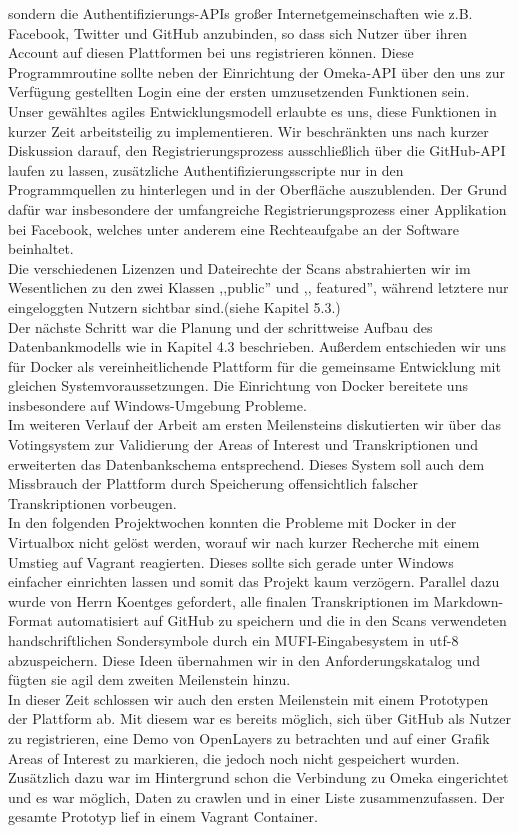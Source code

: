 \documentclass{article}
\begin{document}
sondern die Authentifizierungs-APIs großer Internetgemeinschaften wie z.B. Facebook, Twitter und GitHub anzubinden, so dass sich Nutzer über ihren Account auf diesen Plattformen bei uns registrieren können.
Diese Programmroutine sollte neben der Einrichtung der Omeka-API über den uns zur Verfügung gestellten Login eine der ersten umzusetzenden Funktionen sein.\\
Unser gewähltes agiles Entwicklungsmodell erlaubte es uns, diese Funktionen in kurzer Zeit arbeitsteilig zu implementieren.
Wir beschränkten uns nach kurzer Diskussion darauf, den Registrierungsprozess ausschließlich über die GitHub-API laufen zu lassen, zusätzliche Authentifizierungsscripte nur in den Programmquellen zu hinterlegen und in der Oberfläche auszublenden. 
Der Grund dafür war insbesondere der umfangreiche Registrierungsprozess einer Applikation bei Facebook, welches unter anderem eine Rechteaufgabe an der Software beinhaltet.\\
Die verschiedenen Lizenzen und Dateirechte der Scans abstrahierten wir im Wesentlichen zu den zwei Klassen ,,public'' und ,, featured'', während letztere nur eingeloggten Nutzern sichtbar sind.(siehe Kapitel 5.3.)\\
Der nächste Schritt war die Planung und der schrittweise Aufbau des Datenbankmodells wie in Kapitel 4.3 beschrieben. 
Außerdem entschieden wir uns für Docker als vereinheitlichende Plattform für die gemeinsame Entwicklung mit gleichen Systemvoraussetzungen.
Die Einrichtung von Docker bereitete uns insbesondere auf Windows-Umgebung Probleme.\\
Im weiteren Verlauf der Arbeit am ersten Meilensteins diskutierten wir über das Votingsystem zur Validierung der Areas of Interest und Transkriptionen und 
erweiterten das Datenbankschema entsprechend. 
Dieses System soll auch dem Missbrauch der Plattform durch Speicherung offensichtlich falscher Transkriptionen vorbeugen.\\
In den folgenden Projektwochen konnten die Probleme mit Docker in der Virtualbox nicht gelöst werden, worauf wir nach kurzer Recherche mit einem Umstieg auf Vagrant reagierten.
Dieses sollte sich gerade unter Windows einfacher einrichten lassen und somit das Projekt kaum verzögern.
Parallel dazu wurde von Herrn Koentges gefordert, alle finalen Transkriptionen im Markdown-Format automatisiert auf GitHub zu speichern und
die in den Scans verwendeten handschriftlichen Sondersymbole durch ein MUFI-Eingabesystem in utf-8 abzuspeichern.
Diese Ideen übernahmen wir in den Anforderungskatalog und fügten sie agil dem zweiten Meilenstein hinzu.\\
In dieser Zeit schlossen wir auch den ersten Meilenstein mit einem Prototypen der Plattform ab. 
Mit diesem war es bereits möglich, sich über GitHub als Nutzer zu registrieren, eine Demo von OpenLayers zu betrachten und 
auf einer Grafik Areas of Interest zu markieren, die jedoch noch nicht gespeichert wurden. 
Zusätzlich dazu war im Hintergrund schon die Verbindung zu Omeka eingerichtet und es war möglich, 
Daten zu crawlen und in einer Liste zusammenzufassen. Der gesamte Prototyp lief in einem Vagrant Container.\\
\end{document}

